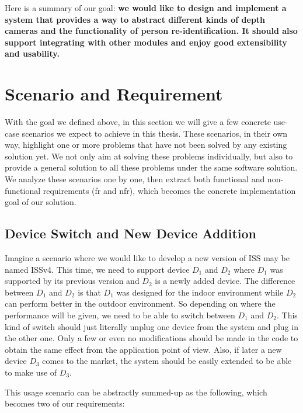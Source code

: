 Here is a summary of our goal:
\textbf{
    we would like to design and implement a system that provides a way to
	abstract different kinds of depth cameras and the functionality of person
	re-identification. 
    It should also support integrating with other modules and enjoy good
    extensibility and usability.
}

\section{Scenario and Requirement}
\label{sec:intro-scen-req}

With the goal we defined above, in this section we will give a few concrete
use-case scenarios we expect to achieve in this thesis.
These scenarios, in their own way, highlight one or more problems that have not
been solved by any existing solution yet. We not only aim at solving these problems
individually, but also to provide a general solution to all these problems
under the same software solution.
We analyze these scenarios one by one, then extract both functional and
non-functional requirements (\acrshort{fr} and \acrshort{nfr}), which becomes 
the concrete implementation goal of our solution.

\subsection{Device Switch and New Device Addition}
\label{sec:intro-sq-dev}

Imagine a scenario where we would like to develop a new version of ISS
may be named ISSv4. This time, we need to support device $D_1$ and $D_2$ where
$D_1$ was supported by its previous version and $D_2$ is a newly added device.
The difference between $D_1$ and $D_2$ is that $D_1$ was designed for the indoor
environment while $D_2$ can perform better in the outdoor environment. So depending on
where the performance will be given, we need to be able to switch between $D_1$
and $D_2$. This kind of switch should just literally unplug one device from
the system and plug in the other one. Only a few or even no modifications should
be made in the code to obtain the same effect from the application point of
view. Also, if later a new device $D_3$ comes to the market, the system
should be easily extended to be able to make use of $D_3$.

This usage scenario can be abstractly summed-up as the following, which becomes
two of our requirements:

